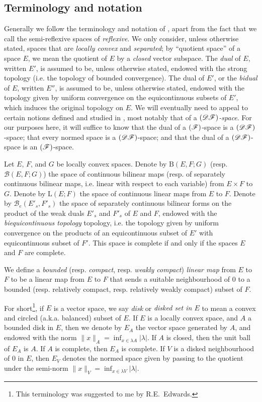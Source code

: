 \documentclass{article}
\theoremstyle{plain}
\newcommand{\BB}{\mathrm{B}}
\newcommand{\LL}{\mathrm{L}}
\newcommand{\sBB}{\mathscr{B}}
\newcommand{\DF}{\mbox{\normalfont($\mathscr{DF}$)}}
\newcommand{\FF}{\mbox{\normalfont($\mathscr{F}$)}}
\newcommand{\oldpage}[1]{\marginpar{\footnotesize$\Big\vert$ \textit{p.~#1}}}
\begin{document}
\subsection*{Terminology and notation}
\label{subsection:terminology-and-notation}
%

Generally we follow the terminology and notation of \cite{3}, apart from the fact that we call the semi-reflexive spaces of \cite{3} \emph{reflexive}.
We only consider, unless otherwise stated, spaces that are \emph{locally convex} and \emph{separated};
by ``quotient space'' of a space $E$, we mean the quotient of $E$ by a \emph{closed} vector subspace.
The \emph{dual} of $E$, written $E'$, is assumed to be, unless otherwise stated, endowed with the strong topology (i.e. the topology
\oldpage{75}
of bounded convergence).
The dual of $E'$, or the \emph{bidual} of $E$, written $E''$, is assumed to be, unless otherwise stated, endowed with the topology given by uniform convergence on the equicontinuous subsets of $E'$, which induces the original topology on $E$.
We will eventually need to appeal to certain notions defined and studied in \cite{6}, most notably that of a \emph{$\DF$-space}.
For our purposes here, it will suffice to know that the dual of a $\FF$-space is a $\DF$-space; that every normed space is a $\DF$-space; and that the dual of a $\DF$-space is an $\FF$-space.

Let $E$, $F$, and $G$ be locally convex spaces.
Denote by $\BB(E,F;G)$ (resp. $\sBB(E,F;G)$) the space of continuous bilinear maps (resp. of separately continuous bilinear maps, i.e. linear with respect to each variable) from $E\times F$ to $G$.
Denote by $\LL(E;F)$ the space of continuous linear maps from $E$ to $F$.
Denote by $\sBB_e(E'_s,F'_s)$ the space of separately continuous bilinear forms on the product of the weak duals $E'_s$ and $F'_s$ of $E$ and $F$, endowed with the \emph{biequicontinuous topology} topology, i.e. the topology given by uniform convergence on the products of an equicontinuous subset of $E'$ with equicontinuous subset of $F'$.
This space is complete if and only if the spaces $E$ and $F$ are complete.

We define a \emph{bounded} (resp. \emph{compact}, resp. \emph{weakly compact}) \emph{linear map} from $E$ to $F$ to be a linear map from $E$ to $F$ that sends a suitable neighbourhood of $0$ to a bounded (resp. relatively compact, resp. relatively weakly compact) subset of $F$.

For short\footnote{This terminology was suggested to me by R.E.~Edwards.}, if $E$ is a vector space, we say \emph{disk} or \emph{disked set in $E$} to mean a convex and circled (a.k.a. balanced) subset of $E$.
If $E$ is a locally convex space, and $A$ a bounded disk in $E$, then we denote by $E_A$ the vector space generated by $A$, and endowed with the norm $\|x\|_A=\inf_{x\in\lambda A}|\lambda|$.
If $A$ is closed, then the unit ball of $E_A$ is $A$.
If $A$ is complete, then $E_A$ is complete.
If $V$ is a disked neighbourhood of $0$ in $E$, then $E_V$ denotes the normed space given by passing to the quotient under the semi-norm $\|x\|_V=\inf_{x\in\lambda V}|\lambda|$.
\end{document}
